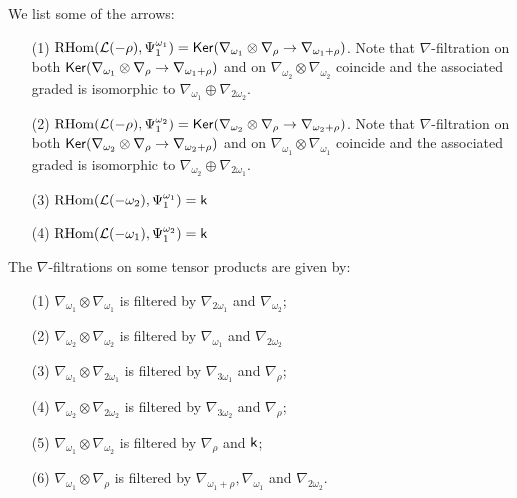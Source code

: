 \documentclass[sn-mathphys-num]{sn-jnl}%
\newcommand{\Ll}{\mathcal L}
\newcommand*{\RHom}{\mathop{\mathrm {RHom}}\nolimits}
\theoremstyle{definition}
\begin{document}
We list some of the arrows:

\begin{itemize}

\item[(1)] $\RHom (\Ll(-\rho),\Psi _1^{\omega _1})={\sf Ker}(\nabla _{\omega _1}\otimes \nabla _{\rho}\rightarrow \nabla _{\omega _1+\rho})$. Note that $\nabla$-filtration on both ${\sf Ker}(\nabla _{\omega _1}\otimes \nabla _{\rho}\rightarrow \nabla _{\omega _1+\rho})$ and on $\nabla _{\omega _2}\otimes \nabla _{\omega _2}$ coincide and the associated graded is isomorphic to $\nabla _{\omega _1}\oplus \nabla _{2\omega _2}$.

\item[(2)] $\RHom (\Ll(-\rho),\Psi _1^{\omega _2})={\sf Ker}(\nabla _{\omega _2}\otimes \nabla _{\rho}\rightarrow \nabla _{\omega _2+\rho})$. Note that $\nabla$-filtration on both ${\sf Ker}(\nabla _{\omega _2}\otimes \nabla _{\rho}\rightarrow \nabla _{\omega _2+\rho})$ and on $\nabla _{\omega _1}\otimes \nabla _{\omega _1}$ coincide and the associated graded is isomorphic to $\nabla _{\omega _2}\oplus \nabla _{2\omega _1}$.

\item[(3)] $\RHom (\Ll(-\omega _2),\Psi _1^{\omega _1})={\sf k}$

\item[(4)] $\RHom (\Ll(-\omega _1),\Psi _1^{\omega _2})={\sf k}$

\end{itemize}

The $\nabla$-filtrations on some tensor products are given by:

\begin{itemize}

\item[(1)] $\nabla _{\omega _1}\otimes \nabla _{\omega _1}$ is filtered by $\nabla _{2\omega _1}$ and $\nabla _{\omega _2}$;

\item[(2)] $\nabla _{\omega _2}\otimes \nabla _{\omega _2}$ is filtered by $ \nabla _{\omega _1}$ and $\nabla _{2\omega _2}$

\item[(3)] $\nabla _{\omega _1}\otimes \nabla _{2\omega _1}$ is filtered by 
$\nabla _{3\omega _1}$ and $\nabla _{\rho}$;

\item[(4)] $\nabla _{\omega _2}\otimes \nabla _{2\omega _2}$ is filtered by
$\nabla _{3\omega _2}$ and $\nabla _{\rho}$;

\item[(5)] $\nabla _{\omega _1}\otimes \nabla _{\omega _2}$ is filtered by $\nabla _{\rho}$ and ${\sf k}$;

\item[(6)] $\nabla _{\omega _1}\otimes \nabla _{\rho}$ is filtered by $\nabla _{\omega _1+\rho},\nabla _{\omega _1}$ and $\nabla _{2\omega _2}$.

\end{itemize}
\end{document}
